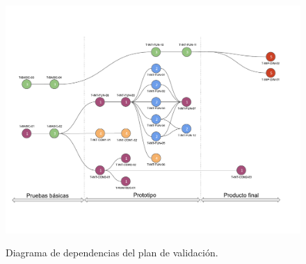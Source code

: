 %
%
%

\label{sec:BancoDePruebas}


\label{sec:PlanValidacion}


\label{sec:MatrizTrazabilidad}


\begin{figure}[H]
	\centering
	\includegraphics[width=0.9\linewidth]{ImagenesPlan de validacion/Diagrama de Dependencias de Validacion}
	\label{fig:diagrama_plan_validacion}
	\caption{Diagrama de dependencias del plan de validación.}
\end{figure}

%